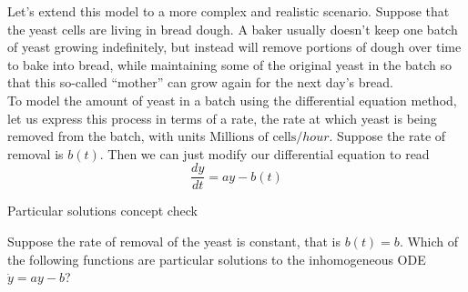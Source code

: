Let's extend this model to a more complex and realistic scenario.
Suppose that the yeast cells are living in bread dough.
A baker usually doesn't keep one batch of yeast growing indefinitely,
but instead will remove portions of dough over time to bake into bread,
while maintaining some of the original yeast in the batch so
that this so-called ``mother'' can grow again for the next day's bread.\\

To model the amount of yeast in a batch using the differential equation method,
let us express this process in terms of a rate, the rate at which yeast is being removed from the batch,
with units \textbf{$\text{Millions of cells}/hour$}.
Suppose the rate of removal is $b(t)$.
Then we can just modify our differential equation to read
\begin{equation*}
  \frac{dy}{dt} = ay -b(t)
\end{equation*}

\begin{exercise}
  Particular solutions concept check
\end{exercise}
Suppose the rate of removal of the yeast is constant,
that is $b(t) = b$.
Which of the following functions are particular solutions to the inhomogeneous ODE
$\dot{y} = ay − b$?
\clearpage



